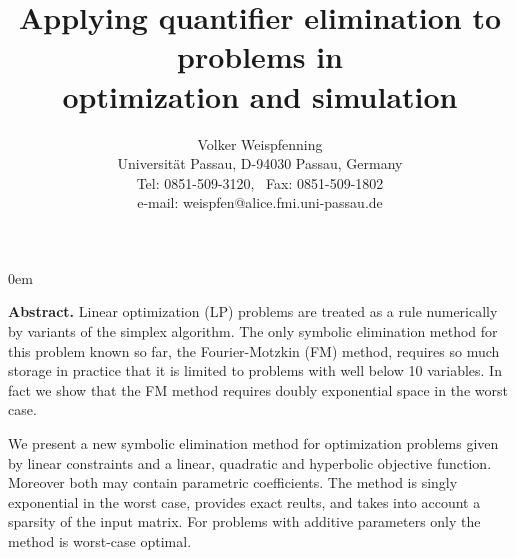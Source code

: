 


\newcommand{\offset}{\= \+}
\newcommand{\inset}{\- \\}
\let\fns=\footnotesize
\def\xref#1{\marginpar[{\fns #1}]{{\fns #1}}\ref{#1}}
\def\xlabel#1{\marginpar[{\fns #1}]{{\fns #1}}\label{#1}}
\def\xcite#1{\marginpar[{\fns #1}]{{\fns #1}}\cite{#1}}
\def\xindex#1{\marginpar[{\fns #1}]{{\fns #1}}\index{#1}}
\def\xglossary#1{\marginpar[{\fns #1}]{{\fns #1}}\glossary{#1}}

\parindent0em

\newcommand{\ord}[1]{\mbox{$\vert #1 \vert$}}
\def\Lrarr{\Leftrightarrow}
\def\rarr{\longrightarrow}
\def\Rarr{\Longrightarrow}
\def\Larr{\Longleftarrow}

\setlength{\parindent}{0pt}
\setlength{\parskip}{5pt plus 2pt minus 1pt}
\addtolength{\topsep}{-7pt}

\addtolength{\textwidth}{1.8cm}
\addtolength{\textheight}{2.8cm}




\title{Applying quantifier elimination to problems in \\ 
       optimization and simulation}


\author{Volker Weispfenning   \\
Universit\"at Passau, D-94030 Passau,
Germany  \\
Tel: 0851-509-3120, \ Fax: 0851-509-1802 \\
e-mail: weispfen@alice.fmi.uni-passau.de}

\maketitle


\date{}



{\bf Abstract.} Linear optimization (LP) problems are treated as a 
rule numerically by variants of the simplex algorithm. The only 
symbolic elimination method for this problem known so far, 
the Fourier-Motzkin (FM) method, requires 
so much storage in practice that it is limited to problems with well
below 10 variables. In fact we show that the FM method requires  
doubly
exponential space in the worst case. 


We present a new symbolic elimination 
method for optimization problems given by linear constraints and a  
linear,
quadratic and hyperbolic objective function. Moreover both may  
contain
parametric coefficients. The method is singly
exponential in the worst case, provides exact reults, 
and takes into account a sparsity of the input matrix.
For problems with additive parameters only the method is
worst-case optimal. 


